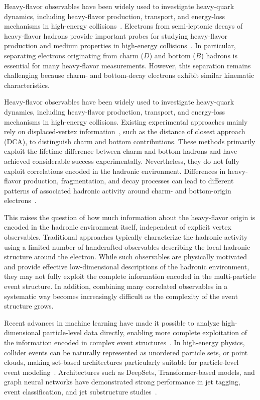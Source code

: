 \documentclass[preprint,12pt]{elsarticle}
\begin{document}
Heavy-flavor observables have been widely used to investigate heavy-quark dynamics, including heavy-flavor production, transport, and energy-loss mechanisms in high-energy collisions~\cite{Rapp:2018qla,Dong:2019unq,Zhang:2025tgt}.
Electrons from semi-leptonic decays of heavy-flavor hadrons provide important probes for studying heavy-flavor production and medium properties in high-energy collisions~\cite{ALICE:2014ivb,ALICE:2012acz,Averbeck:2004dv,PHENIX:2010xji}. In particular, separating electrons originating from charm ($D$) and bottom ($B$) hadrons is essential for many heavy-flavor measurements. However, this separation remains challenging because charm- and bottom-decay electrons exhibit similar kinematic characteristics.

Heavy-flavor observables have been widely used to investigate heavy-quark dynamics, including heavy-flavor production, transport, and energy-loss mechanisms in high-energy collisions.
Existing experimental approaches mainly rely on displaced-vertex information~\cite{PHENIX:2015ynp, ALICE:2019nuy, ALICE:2021mgk, STAR:2021uzu}, such as the distance of closest approach (DCA), to distinguish charm and bottom contributions. These methods primarily exploit the lifetime difference between charm and bottom hadrons and have achieved considerable success experimentally. Nevertheless, they do not fully exploit correlations encoded in the hadronic environment. Differences in heavy-flavor production, fragmentation, and decay processes can lead to different patterns of associated hadronic activity around charm- and bottom-origin electrons~\cite{ALICE:2023kjg, Thomas:2024cso, Andronic:2015wma, PHENIX:2009dpd}. 

This raises the question of how much information about the heavy-flavor origin is encoded in the hadronic environment itself, independent of explicit vertex observables. Traditional approaches typically characterize the hadronic activity using a limited number of handcrafted observables describing the local hadronic structure around the electron. While such observables are physically motivated and provide effective low-dimensional descriptions of the hadronic environment, they may not fully exploit the complete information encoded in the multi-particle event structure. In addition, combining many correlated observables in a systematic way becomes increasingly difficult as the complexity of the event structure grows.

Recent advances in machine learning have made it possible to analyze high-dimensional particle-level data directly, enabling more complete exploitation of the information encoded in complex event structures~\cite{Zaheer:2017wmg, Wang:2018nkf}. In high-energy physics, collider events can be naturally represented as unordered particle sets, or point clouds, making set-based architectures particularly suitable for particle-level event modeling~\cite{Kasieczka:2021xcg, Guest:2018yhq, Albertsson:2018maf, Radovic:2018dip}. Architectures such as DeepSets, Transformer-based models, and graph neural networks have demonstrated strong performance in jet tagging, event classification, and jet substructure studies~\cite{Louppe:2017ipp, Komiske:2018cqr,Qu:2019gqs,Qu:2022mxj}.
\end{document}
